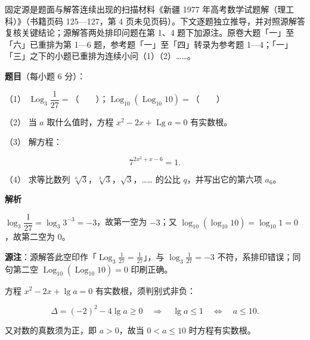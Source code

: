 

\begin{gktip}
固定源是题面与解答连续出现的扫描材料《新疆 1977 年高考数学试题解（理工科）》（书籍页码 125—127，第 4 页未见页码）。下文逐题独立推导，并对照源解答复核关键结论；源解答两处排印问题在第 1、4 题下加源注。原卷大题「一」至「六」已重排为第 1—6 题，参考题「一」至「四」转录为参考题 1—4；「一」「三」之下的小题已重排为连续小问（1）（2）……。
\end{gktip}

\begin{answer}

\textbf{题目}（每小题 6 分）：

（1） $\operatorname{Log}_3\dfrac{1}{27}=$\mbox{（　　）}；$\operatorname{Log}_{10}(\operatorname{Log}_{10}10)=$\mbox{（　　）}

（2） 当 $a$ 取什么值时，方程 $x^2-2x+\operatorname{Lg}a=0$ 有实数根。

（3） 解方程：

\nopagebreak[4]
\[
7^{2x^2+x-6}=1.
\]

（4） 求等比数列 $\sqrt[6]{3}$，$\sqrt[3]{3}$，$\sqrt{3}$，…… 的公比 $q$，并写出它的第六项 $a_6$。

\textbf{解析}


$\log_3\dfrac{1}{27}=\log_3 3^{-3}=-3$，故第一空为 $-3$；又 $\log_{10}(\log_{10}10)=\log_{10}1=0$，故第二空为 $0$。

\begin{gktip}
\textbf{源注}：源解答此空印作「$\operatorname{Log}_3\frac{1}{27}=\frac{1}{27}$」，与 $\log_3\frac{1}{27}=-3$ 不符，系排印错误；同句第二空 $\operatorname{Log}_{10}(\operatorname{Log}_{10}10)=0$ 印刷正确。
\end{gktip}


方程 $x^2-2x+\lg a=0$ 有实数根，须判别式非负：

\nopagebreak[4]
\[
\Delta=(-2)^2-4\lg a\ge0
\quad\Longrightarrow\quad
\lg a\le1
\quad\Longleftrightarrow\quad
a\le10.
\]

又对数的真数须为正，即 $a>0$，故当 $0<a\le10$ 时方程有实数根。


\end{answer}
